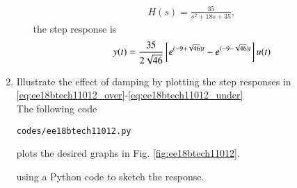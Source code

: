 \begin{enumerate}[label=\thesubsection.\arabic*.,ref=\thesubsection.\theenumi]
\begin{enumerate}
\begin{align}
H(s)=\frac{35}{s^2+18s+35},
\end{align}
the step response is
\begin{equation}
    y(t)=\frac{35}{2\sqrt{46}}{}\left[e^{(-9+\sqrt{46})t}-e^{(-9-\sqrt{46})t}\right]u(t)
\label{eq:ee18btech11012_under}
\end{equation}
\end{enumerate}
\item Illustrate the effect of damping by plotting the step responses in \eqref{eq:ee18btech11012_over}-\eqref{eq:ee18btech11012_under}
\\
\solution The following code
\begin{lstlisting}
codes/ee18btech11012.py
\end{lstlisting}
%
plots the desired graphs in
Fig.     \ref{fig:ee18btech11012}. 
%

using a Python code to sketch the response.  
\end{enumerate}
